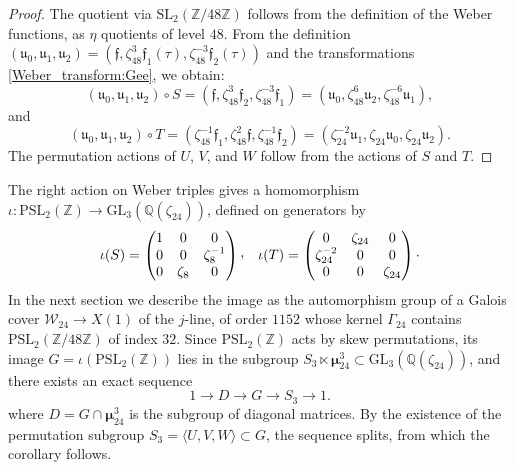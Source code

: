 \documentclass{amsart}
\newcommand{\cW}{\mathcal{W}}
\newcommand{\QQ}{\mathbb{Q}}
\newcommand{\ZZ}{\mathbb{Z}}
\newcommand{\GL}{\mathrm{GL}}
\newcommand{\SL}{\mathrm{SL}}
\newcommand{\PSL}{\mathrm{PSL}}
\newcommand{\ff}{\mathfrak{f}}
\newcommand{\uu}{\mathfrak{u}}
\newcommand{\ccomma}{\raisebox{0.4ex}{,}}
\newcommand{\mmu}{\boldsymbol{\mu}}
\begin{document}
\begin{proof}
  The quotient via $\SL_2(\ZZ/48\ZZ)$ follows from the definition of the Weber functions,
  as $\eta$ quotients of level $48$.
  From the definition $(\uu_0,\uu_1,\uu_2) = (\ff,\zeta_{48}^3\ff_1(\tau),\zeta_{48}^{-3}\ff_2(\tau))$
  and the transformations \eqref{Weber_transform:Gee}, we obtain:
$$
  (\uu_0,\uu_1,\uu_2) \circ S 
  = (\ff,\zeta_{48}^3\ff_2,\zeta_{48}^{-3}\ff_1) 
  = (\uu_0,\zeta_{48}^6\uu_2,\zeta_{48}^{-6}\uu_1),
$$
and
$$
  (\uu_0,\uu_1,\uu_2) \circ T 
  = (\zeta_{48}^{-1}\ff_1,\zeta_{48}^2\ff,\zeta_{48}^{-1}\ff_2)
  = (\zeta_{24}^{-2}\uu_1,\zeta_{24}\uu_0,\zeta_{24}\uu_2).
$$
The permutation actions of $U$, $V$, and $W$ follow from the actions of $S$ and $T$.
\end{proof}

The right action on Weber triples gives a homomorphism $\iota: \PSL_2(\ZZ) \to \GL_3(\QQ(\zeta_{24}))$,
defined on generators by
$$
\iota(S)
= \left(\begin{array}{@{}ccc@{}}
1 & 0 & 0\\
0 & 0 & \zeta_{8}^{-1}\\
0 & \zeta_{8} & 0
\end{array}\right)\ccomma
\quad
\iota(T)
= \left(\begin{array}{@{}ccc@{}}
0 & \zeta_{24} & 0\\
\zeta_{24}^{-2} & 0 & 0\\ 
0 & 0 & \zeta_{24}
\end{array}\right)\cdot
$$
In the next section we describe the image as the automorphism group of a Galois cover $\cW_{24} \to X(1)$
of the $j$-line, of order $1152$ whose kernel $\Gamma_{24}$ contains $\PSL_2(\ZZ/48\ZZ)$ of index $32$.
Since $\PSL_2(\ZZ)$ acts by skew permutations, its image $G = \iota(\PSL_2(\ZZ))$ lies in the subgroup
$S_3 \ltimes \mmu_{24}^3 \subset \GL_3(\QQ(\zeta_{24}))$, and there exists an exact sequence
$$
1 \longrightarrow D \longrightarrow G \longrightarrow S_3 \longrightarrow 1.
$$
where $D = G \cap \mmu_{24}^3$ is the subgroup of diagonal matrices.  By the existence of the permutation
subgroup $S_3 = \langle{U,V,W}\rangle \subset G$, the sequence splits, from which the corollary follows.
\end{document}
